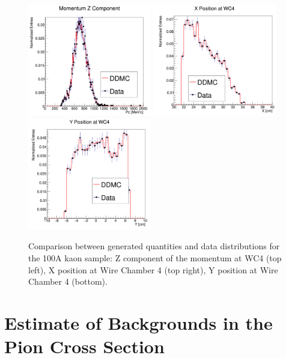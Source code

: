 \begin{figure}[hpbt]
\centering
\includegraphics[width=0.48\textwidth]{Chapter-5/Images/DDMCPz.png}
\includegraphics[width=0.48\textwidth]{Chapter-5/Images/DDMCX.png}
\includegraphics[width=0.48\textwidth]{Chapter-5/Images/DDMCY.png}
\caption{Comparison between generated quantities and data distributions for the 100A kaon sample: Z component of the momentum at WC4 (top left), X position at Wire Chamber 4 (top right), Y position at Wire Chamber 4 (bottom).}
\label{fig:DDMCComparison}
\end{figure}





\section{Estimate of Backgrounds in the Pion Cross Section}\label{ch:PionXSBkgSub}

